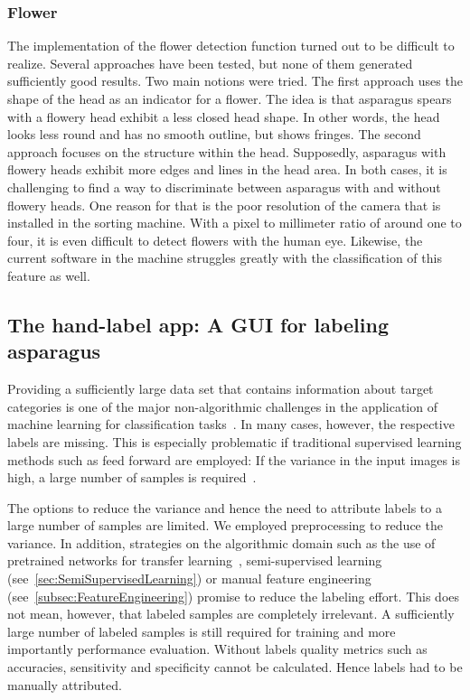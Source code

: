 \subsubsection{Flower}
\label{subsec:Flower}

The implementation of the flower detection function turned out to be difficult to realize. Several approaches have been tested, but none of them generated sufficiently good results. Two main notions were tried. The first approach uses the shape of the head as an indicator for a flower. The idea is that asparagus spears with a flowery head exhibit a less closed head shape. In other words, the head looks less round and has no smooth outline, but shows fringes. The second approach focuses on the structure within the head. Supposedly, asparagus with flowery heads exhibit more edges and lines in the head area. In both cases, it is challenging to find a way to discriminate between asparagus with and without flowery heads. One reason for that is the poor resolution of the camera that is installed in the sorting machine. With a pixel to millimeter ratio of around one to four, it is even difficult to detect flowers with the human eye. Likewise, the current software in the machine struggles greatly with the classification of this feature as well.


\subsection{The hand-label app: A GUI for labeling asparagus}
\label{sec:LabelApp}

Providing a sufficiently large data set that contains information about target categories is one of the major non-algorithmic challenges in the application of machine learning for classification tasks~\citep{al2018labeling}. In many cases, however, the respective labels are missing. This is especially problematic if traditional supervised learning methods such as feed forward  are employed: If the variance in the input images is high, a large number of samples is required~\citep{russakovsky2015imagenet}. 

The options to reduce the variance and hence the need to attribute labels to a large number of samples are limited. We employed preprocessing to reduce the variance. In addition, strategies on the algorithmic domain such as the use of pretrained networks for transfer learning~\citep{gupta2018keras}, semi-supervised learning (see~\autoref{sec:SemiSupervisedLearning}) or manual feature engineering (see~\autoref{subsec:FeatureEngineering}) promise to reduce the labeling effort. This does not mean, however, that labeled samples are completely irrelevant. A sufficiently large number of labeled samples is still required for training and more importantly performance evaluation. Without labels quality metrics such as accuracies, sensitivity and specificity cannot be calculated. Hence labels had to be manually attributed.

